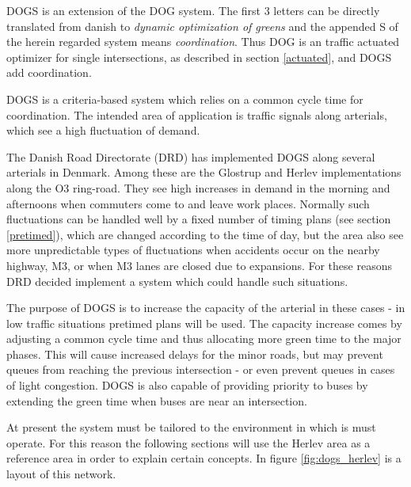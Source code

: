 DOGS is an extension of the DOG system. The first 3 letters can be directly translated from danish to \textit{dynamic optimization of greens} and the appended S of the herein regarded system means \textit{coordination}. Thus DOG is an traffic actuated optimizer for single intersections, as described in section \ref{actuated}, and DOGS add coordination.

DOGS is a criteria-based system which relies on a common cycle time for coordination. The intended area of application is traffic signals along arterials, which see a high fluctuation of demand. 

The Danish Road Directorate (DRD) has implemented DOGS along several arterials in Denmark. 
Among these are the Glostrup and Herlev implementations along the O3 ring-road. They see high increases in demand in the morning and afternoons when commuters come to and leave work places. Normally such fluctuations can be handled well by a fixed number of timing plans (see section \ref{pretimed}), which are changed according to the time of day, but the area also see more unpredictable types of fluctuations when accidents occur on the nearby highway, M3, or when M3 lanes are closed due to expansions. For these reasons DRD decided implement a system which could handle such situations.

The purpose of DOGS is to increase the capacity of the arterial in these cases - in low traffic situations pretimed plans will be used. The capacity increase comes by adjusting a common cycle time and thus allocating more green time to the major phases. This will cause increased delays for the minor roads, but may prevent queues from reaching the previous intersection - or even prevent queues in cases of light congestion.
DOGS is also capable of providing priority to buses by extending the green time when buses are near an intersection.

At present the system must be tailored to the environment in which is must operate. For this reason the following sections will use the Herlev area as a reference area in order to explain certain concepts. In figure \ref{fig:dogs_herlev} is a layout of this network.

